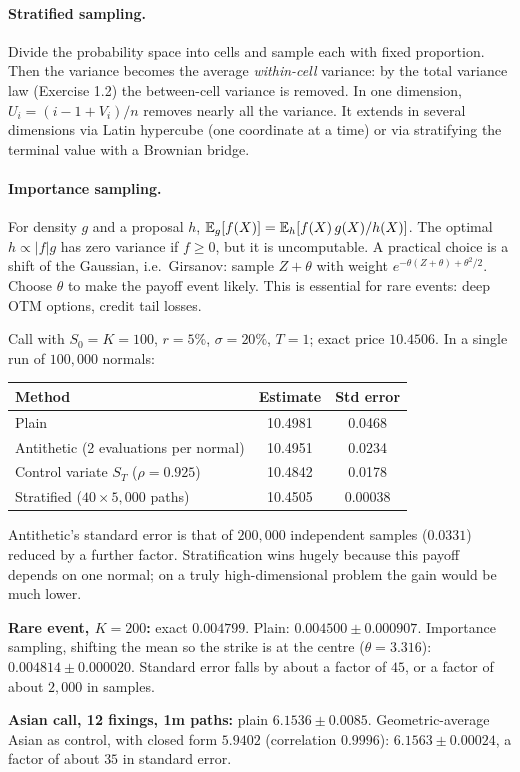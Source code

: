 \paragraph{Stratified sampling.} Divide the probability space into cells and sample each with fixed proportion. Then the variance becomes the average \emph{within-cell} variance: by the total variance law (Exercise 1.2) the between-cell variance is removed. In one dimension, $U_i=(i-1+V_i)/n$ removes nearly all the variance. It extends in several dimensions via Latin hypercube (one coordinate at a time) or via stratifying the terminal value with a Brownian bridge.

\paragraph{Importance sampling.} For density $g$ and a proposal $h$,
$\mathbb{E}_g[f(X)]=\mathbb{E}_h[f(X)\,g(X)/h(X)]$. The optimal $h\propto|f|g$ has zero variance if $f\ge0$, but it is uncomputable. A practical choice is a shift of the Gaussian, i.e.\ Girsanov: sample $Z+\theta$ with weight $e^{-\theta(Z+\theta)+\theta^2/2}$. Choose $\theta$ to make the payoff event likely. This is essential for rare events: deep OTM options, credit tail losses.

\begin{numcheck}
Call with $S_0=K=100$, $r=5\%$, $\sigma=20\%$, $T=1$; exact price $10.4506$. In a single run of $100{,}000$ normals:
\begin{center}
\begin{tabular}{lcc}
\toprule
Method & Estimate & Std error\\
\midrule
Plain & 10.4981 & 0.0468\\
Antithetic (2 evaluations per normal) & 10.4951 & 0.0234\\
Control variate $S_T$ ($\rho=0.925$) & 10.4842 & 0.0178\\
Stratified ($40\times5{,}000$ paths) & 10.4505 & 0.00038\\
\bottomrule
\end{tabular}
\end{center}
Antithetic's standard error is that of $200{,}000$ independent samples ($0.0331$) reduced by a further factor. Stratification wins hugely because this payoff depends on one normal; on a truly high-dimensional problem the gain would be much lower.

\textbf{Rare event, $K=200$:} exact $0.004799$. Plain: $0.004500\pm0.000907$. Importance sampling, shifting the mean so the strike is at the centre ($\theta=3.316$): $0.004814\pm0.000020$. Standard error falls by about a factor of $45$, or a factor of about $2{,}000$ in samples.

\textbf{Asian call, 12 fixings, 1m paths:} plain $6.1536\pm0.0085$. Geometric-average Asian as control, with closed form $5.9402$ (correlation $0.9996$): $6.1563\pm0.00024$, a factor of about $35$ in standard error.
\end{numcheck}

